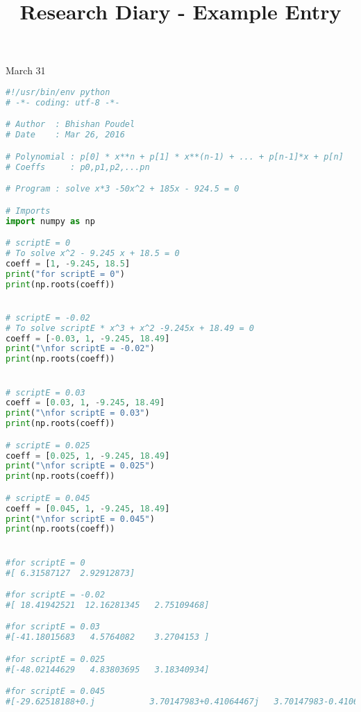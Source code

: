 \documentclass[11pt,letterpaper]{article}
\begin{document}
\univlogo

\title{Research Diary - Example Entry}

{\Huge March 31}\\[5mm]


\begin{lstlisting}[language=python]
#!/usr/bin/env python
# -*- coding: utf-8 -*-

# Author  : Bhishan Poudel
# Date    : Mar 26, 2016

# Polynomial : p[0] * x**n + p[1] * x**(n-1) + ... + p[n-1]*x + p[n]
# Coeffs     : p0,p1,p2,...pn

# Program : solve x*3 -50x^2 + 185x - 924.5 = 0

# Imports
import numpy as np

# scriptE = 0
# To solve x^2 - 9.245 x + 18.5 = 0
coeff = [1, -9.245, 18.5]
print("for scriptE = 0")
print(np.roots(coeff))


# scriptE = -0.02
# To solve scriptE * x^3 + x^2 -9.245x + 18.49 = 0
coeff = [-0.03, 1, -9.245, 18.49]
print("\nfor scriptE = -0.02")
print(np.roots(coeff))


# scriptE = 0.03
coeff = [0.03, 1, -9.245, 18.49]
print("\nfor scriptE = 0.03")
print(np.roots(coeff))

# scriptE = 0.025
coeff = [0.025, 1, -9.245, 18.49]
print("\nfor scriptE = 0.025")
print(np.roots(coeff))

# scriptE = 0.045
coeff = [0.045, 1, -9.245, 18.49]
print("\nfor scriptE = 0.045")
print(np.roots(coeff))


#for scriptE = 0
#[ 6.31587127  2.92912873]

#for scriptE = -0.02
#[ 18.41942521  12.16281345   2.75109468]

#for scriptE = 0.03
#[-41.18015683   4.5764082    3.2704153 ]

#for scriptE = 0.025
#[-48.02144629   4.83803695   3.18340934]

#for scriptE = 0.045
#[-29.62518188+0.j           3.70147983+0.41064467j   3.70147983-0.41064467j]

\end{lstlisting}
\end{document}
